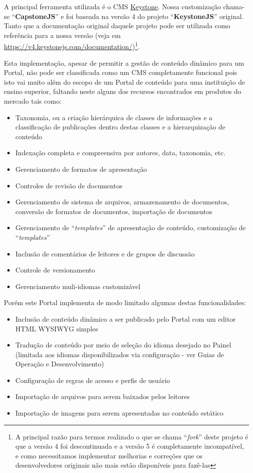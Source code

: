 A principal ferramenta utilizada é o \gls{CMS} \href{https://www.keystonejs.com}{Keystone}. Nossa customização chama-se ``\textbf{CapstoneJS}'' e foi baseada na versão 4 do projeto ``\textbf{KeystoneJS}'' original. Tanto que a documentação original daquele projeto pode ser utilizada como referência para a nossa versão (veja em \href{https://v4.keystonejs.com/documentation/}{https://v4.keystonejs.com/documentation/})\footnote{A principal razão para termos realizado o que se chama ``\textit{fork}'' deste projeto é que a versão 4 foi descontinuada e a versão 5 é completamente incompatível, e como necessitamos implementar melhorias e correções que os desenvolvedores originais não mais estão disponíveis para fazê-las}.

Esta implementação, apesar de permitir a gestão de conteúdo dinâmico para um Portal, não pode ser classificada como um \gls{CMS} completamente funcional pois isto vai muito além do escopo de um Portal de conteúdo para uma instituição de ensino superior, faltando neste alguns dos recursos encontrados em produtos do mercado tais como:

\begin{itemize}
    \item Taxonomia, ou a criação hierárquica de classes de informações e a classificação de publicações dentro destas classes e a hierarquização de conteúdo
    \item Indexação completa e compreensiva por autores, data, taxonomia, etc.
    \item Gerenciamento de formatos de apresentação
    \item Controles de revisão de documentos
    \item Gerenciamento de sistema de arquivos, armazenamento de documentos, conversão de formatos de documentos, importação de documentos
    \item Gerenciamento de ``\textit{templates}'' de apresentação de conteúdo, customização de ``\textit{templates}''
    \item Inclusão de comentários de leitores e de grupos de discussão
    \item Controle de versionamento
    \item Gerenciamento muli-idiomas customizável
\end{itemize}

Porém este Portal implementa de modo limitado algumas destas funcionalidades:

\begin{itemize}
    \item Inclusão de conteúdo dinâmico a ser publicado pelo Portal com um editor \gls{HTML} \gls{WYSIWYG} simples
    \item Tradução de conteúdo por meio de seleção do idioma desejado no Painel (limitada aos idiomas disponibilizados via configuração - ver Guias de Operação e Desenvolvimento)
    \item Configuração de regras de acesso e perfis de usuário
    \item Importação de arquivos para serem baixados pelos leitores
    \item Importação de imagens para serem apresentadas no conteúdo estático
\end{itemize}

